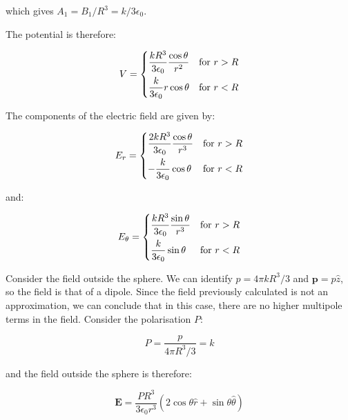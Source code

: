 \documentclass[12pt]{article}
\begin{document}
which gives $A_{1} = B_{1}/R^{3} = k/3\epsilon_{0}$.

The potential is therefore:

\begin{equation}
    V =
    \begin{dcases}
        \frac{kR^{3}}{3\epsilon_{0}} \frac{\cos{\theta}}{r^{2}} & \text{for } r > R \\
        \frac{k}{3\epsilon_{0}} r \cos{\theta}                  & \text{for } r < R
    \end{dcases}
\end{equation}

The components of the electric field are given by:

\begin{equation}
    E_{r} =
    \begin{dcases}
        \frac{2kR^{3}}{3\epsilon_{0}} \frac{\cos{\theta}}{r^{3}} & \text{for } r > R \\
        -\frac{k}{3\epsilon_{0}} \cos{\theta}                    & \text{for } r < R
    \end{dcases}
\end{equation}

and:

\begin{equation}
    E_{\theta} =
    \begin{dcases}
        \frac{kR^{3}}{3\epsilon_{0}} \frac{\sin{\theta}}{r^{3}} & \text{for } r > R \\
        \frac{k}{3\epsilon_{0}} \sin{\theta}                    & \text{for } r < R
    \end{dcases}
\end{equation}

Consider the field outside the sphere. We can identify $p = 4\pi kR^{3}/3$ and $\mathbf{p} = p \hat{z}$, so the field is that of a dipole. Since the field previously calculated is not an approximation, we can conclude that in this case, there are no higher multipole terms in the field. Consider the polarisation $P$:

\begin{equation}
    P = \frac{p}{4\pi R^{3}/3} = k
\end{equation}

and the field outside the sphere is therefore:

\begin{equation}
    \mathbf{E} = \frac{PR^{3}}{3\epsilon_{0}r^{3}} \left( 2\cos{\theta} \hat{r} + \sin{\theta} \hat{\theta} \right)
\end{equation}
\end{document}
